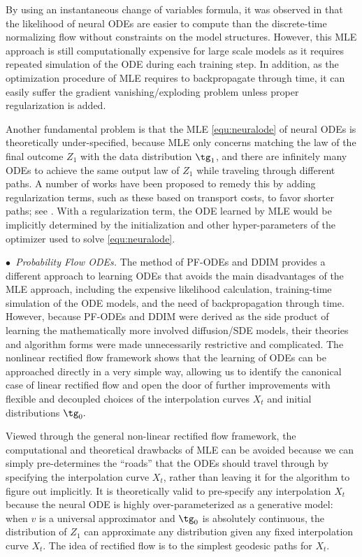 \documentclass[11pt]{article}
\begin{document}
By using  
an instantaneous change of variables formula, 
it was observed in \cite{chen2018neural} that the likelihood of neural ODEs
are easier to compute than the discrete-time normalizing flow without constraints on the model structures. 
However, this MLE approach is still computationally expensive for large scale models as it requires repeated simulation of the ODE during each training step.
In addition, 
as the optimization procedure of MLE requires to  backpropagate through time,
it can easily suffer the gradient vanishing/exploding problem unless proper regularization is added. 

Another fundamental problem is that 
the MLE \eqref{equ:neuralode}  of neural ODEs is theoretically under-specified, 
because MLE only concerns matching the law of the final outcome $Z_1$ with the data distribution $\tg_1$, and  there are infinitely many ODEs to achieve the same output law of $Z_1$ while traveling through different paths. 
A number of works have been proposed to remedy  this by adding 
regularization terms, such as these based on transport costs, to favor shorter paths; see  \cite[][]{nichol2021improved, onken2021ot}. 
With a regularization term, the ODE learned by MLE would be implicitly determined by the initialization and other hyper-parameters of the optimizer used to solve \eqref{equ:neuralode}.  

\emph{$\bullet$~Probability Flow ODEs.}  
The method of PF-ODEs \cite{song2020score} and DDIM \cite{song2020denoising} provides a different approach to learning ODEs that avoids the main disadvantages of the MLE approach, including %
the expensive likelihood calculation, training-time simulation of the ODE models, and the need of backpropagation through time.  %
However,
because PF-ODEs and DDIM 
were derived as the side product of learning the mathematically more involved diffusion/SDE models, 
their theories and algorithm forms were made 
unnecessarily restrictive and complicated. 
The nonlinear rectified flow framework shows that the 
learning of ODEs 
can be approached directly in a very simple way, allowing us to identify the canonical case of linear rectified flow  and open the door of further improvements with flexible and decoupled choices of the interpolation curves $X_t$ and initial distributions $\tg_0.$ 


 Viewed through the general non-linear rectified flow  framework, 
 the computational and theoretical drawbacks of MLE can be avoided because 
we can simply pre-determines the ``roads'' 
that the ODEs should travel through 
by specifying the interpolation curve $X_t$,  
rather than leaving it for the algorithm to figure out implicitly.  
It is theoretically valid to pre-specify any interpolation  $X_t$ 
because the neural ODE is highly over-parameterized as a generative model: when $v$ is a universal approximator and $\tg_0$ is absolutely continuous, 
the distribution of $Z_1$ can  approximate any distribution given any fixed interpolation curve $X_t$. The idea of rectified flow is to the 
simplest geodesic paths for $X_t$. %
 
\end{document}
